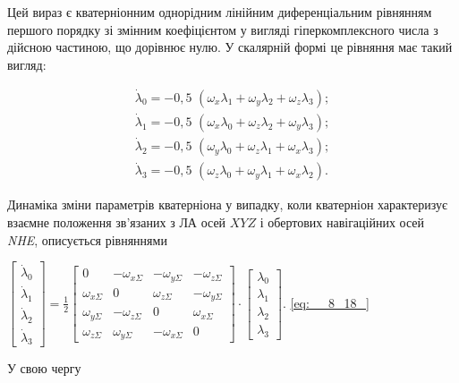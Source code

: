 Цей вираз є кватерніонним однорідним лінійним диференціальним рівнянням першого порядку 
зі змінним коефіцієнтом у вигляді гіперкомплексного числа з дійсною частиною, що 
дорівнює нулю. У скалярній формі це рівняння  має такий вигляд:

\[\begin{array}{l} {\dot{\lambda }_{0} =-0,5\, \, \left(\omega_{x} \lambda_{1} 
+\omega_{y} \lambda_{2} +\omega_{z} \lambda_{3} \right);} \\ {\dot{\lambda }_{1} 
=-0,5\, \, \left(\omega_{x} \lambda_{0} +\omega_{z} \lambda_{2} +\omega_{y} 
\lambda_{3} \right);} \\ {\dot{\lambda }_{2} =-0,5\, \, \left(\omega_{y} \lambda 
_{0} +\omega_{z} \lambda_{1} +\omega_{x} \lambda_{3} \right);} \\ {\dot{\lambda 
}_{3} =-0,5\, \, \left(\omega_{z} \lambda_{0} +\omega_{y} \lambda_{1} +\omega 
_{x} \lambda_{2} \right).} \end{array}\] 

Динаміка зміни параметрів кватерніона у випадку, коли кватерніон характеризує взаємне 
положення зв'язаних з ЛА осей $XYZ$ і обертових навігаційних осей \textit{NHE}, описується 
рівняннями

$\left[\begin{array}{c} {\dot{\lambda }_{0} } \\ {\dot{\lambda }_{1} } \\ {\dot{
\lambda }_{2} } \\ {\dot{\lambda }_{3} } \end{array}\right]=\frac{1}{2} \left[\begin{array}{cccc} 
{0} & {-\omega_{x\Sigma } } & {-\omega_{y\Sigma } } & {-\omega_{z\Sigma } } \\ 
{\omega_{x\Sigma } } & {0} & {\omega_{z\Sigma } } & {-\omega_{y\Sigma } } \\ {
\omega_{y\Sigma } } & {-\omega_{z\Sigma } } & {0} & {\omega_{x\Sigma } } \\ {
\omega_{z\Sigma } } & {\omega_{y\Sigma } } & {-\omega_{x\Sigma } } & {0} \end{array}
\right]\cdot \left[\begin{array}{c} {\lambda_{0} } \\ {\lambda_{1} } \\ {\lambda 
_{2} } \\ {\lambda_{3} } \end{array}\right]$.       \eqref{eq:__8_18_}

У свою чергу  

